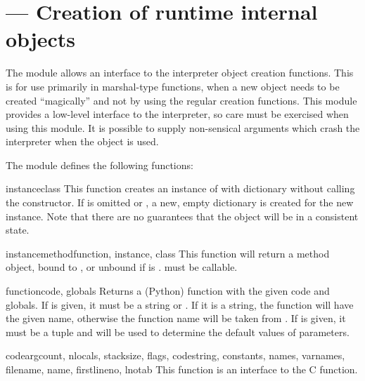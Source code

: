 \section{ ---
         Creation of runtime internal objects}



The  module allows an interface to the interpreter object
creation functions. This is for use primarily in marshal-type functions,
when a new object needs to be created ``magically'' and not by using the
regular creation functions. This module provides a low-level interface
to the interpreter, so care must be exercised when using this module.
It is possible to supply non-sensical arguments which crash the
interpreter when the object is used.

The  module defines the following functions:

\begin{funcdesc}{instance}{class}
This function creates an instance of  with dictionary
 without calling the  constructor.  If
 is omitted or , a new, empty dictionary is
created for the new instance.  Note that there are no guarantees that
the object will be in a consistent state.
\end{funcdesc}

\begin{funcdesc}{instancemethod}{function, instance, class}
This function will return a method object, bound to , or
unbound if  is .   must be
callable.
\end{funcdesc}

\begin{funcdesc}{function}{code, globals}
Returns a (Python) function with the given code and globals. If
 is given, it must be a string or .  If it is a
string, the function will have the given name, otherwise the function
name will be taken from .  If
 is given, it must be a tuple and will be used to
determine the default values of parameters.
\end{funcdesc}

\begin{funcdesc}{code}{argcount, nlocals, stacksize, flags, codestring,
                       constants, names, varnames, filename, name, firstlineno,
                       lnotab}
This function is an interface to the  C
function.
\end{funcdesc}

